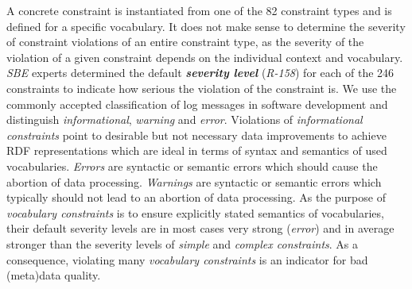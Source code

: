 \documentclass{llncs}
\newcommand{\ke}[1]{\todo[size=\small, color=red!40]{\textbf{Kai:} #1}}
\begin{document}
{A concrete constraint is instantiated from one of the 82 constraint types and is defined for a specific vocabulary.
It does not make sense to determine the severity of constraint violations of an entire constraint type,
as the severity of the violation of a given constraint depends on the individual context and vocabulary.
\emph{SBE} experts determined the default \textbf{\emph{severity level}} (\emph{R-158}) for each of the 246 constraints to indicate how serious the violation of the constraint is.
We use the commonly accepted classification of log messages in software development and distinguish \emph{informational}, \emph{warning} and \emph{error}.
Violations of \emph{informational constraints} point to desirable but not necessary data improvements to achieve RDF representations which are ideal in terms of syntax and semantics of used vocabularies. 
\emph{Errors} are syntactic or semantic errors which should cause the abortion of data processing. 
\emph{Warnings} are syntactic or semantic errors which typically should not lead to an abortion of data processing.
As the purpose of \emph{vocabulary constraints} is to ensure explicitly stated semantics of vocabularies, 
their default severity levels are in most cases very strong (\emph{error}) and 
in average stronger than the severity levels of \emph{simple} and \emph{complex constraints}.
As a consequence, violating many \emph{vocabulary constraints} is an indicator for bad (meta)data quality.

}
\end{document}
